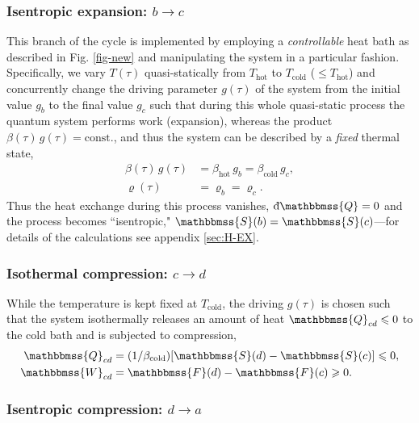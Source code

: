 \documentclass[aps,pra,floatfix,twocolumn,groupedaddress,superscriptaddress,nofootinbib,notitlepage,amsmath,amssymb,]{revtex4-1}
\def\dbar{{\mathchar'26\mkern-12mu \mathrm{d}}}
\begin{document}
\subsubsection{%
Isentropic expansion: $b\rightarrow c$}

This branch of the cycle is implemented by employing a \textit{controllable} heat bath as described in Fig. \ref{fig-new} and manipulating the system in a particular fashion. Specifically, we vary $T(\tau)$ quasi-statically from $T_{\mathrm{hot}}$ to $T_{\mathrm{cold}}$ ($\leqslant T_{\mathrm{hot}}$) and concurrently change the driving parameter $g(\tau)$ of the system from the initial value $g_b$ to the final value $g_c$ such that during this whole quasi-static process the quantum system performs work (expansion), whereas the product $\beta(\tau)\,g(\tau)=\mathrm{const.}$, and thus the system can be described by a \textit{fixed} thermal state,
\begin{align}
\label{adiab1}
\beta(\tau)\,g(\tau) &=\beta_{\mathrm{hot}}\,g_b=\beta_{\mathrm{cold}}\,g_c,\\
\varrho(\tau) &=\varrho_b=\varrho_c.
\end{align}
Thus the heat exchange during this process vanishes,\, $\dbar \mathbbmss{Q}=0$ and the process becomes ``isentropic," $\mathbbmss{S}(b)=\mathbbmss{S}(c)$---for details of the calculations see appendix \ref{sec:H-EX}.

\subsubsection{Isothermal compression: $c\rightarrow d$}

While the temperature is kept fixed at $T_{\mathrm{cold}}$, the driving $g(\tau)$ is chosen such that the system isothermally releases an amount of heat $\mathbbmss{Q}_{cd}\leqslant 0$ to the cold bath and is subjected to compression,
\begin{align}
\label{Work_Iso2}
\mathbbmss{Q}_{cd} &=(1/\beta_{\mathrm{cold}})[\mathbbmss{S}(d)-\mathbbmss{S}(c)]\leqslant 0,\\
\mathbbmss{W}_{cd} &=\mathbbmss{F}(d)-\mathbbmss{F}(c)\geqslant 0. 
\end{align}

\subsubsection{Isentropic compression: $d\rightarrow a$}
\end{document}

